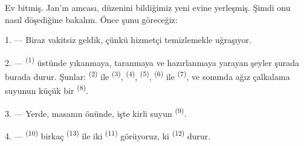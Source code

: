 %
%

\VUsaut{6.0mm}
\VUsaut{1.4mm}
\VUsaut{0.4mm}
\VUsaut{2.2mm}

Ev bitmiş. Jan'ın amcası, düzenini bildiğimiz yeni evine yerleşmiş.
Şimdi onu nasıl döşediğine bakalım. Önce şunu göreceğiz:

\VUsaut{3.0mm}

1. --- Biraz vakitsiz geldik, çünkü hizmetçi  temizlemekle
uğraşıyor.

2. ---  \textsuperscript{(1)} üstünde yıkanmaya,
taranmaya ve hazırlanmaya yarayan şeyler şurada burada durur. Şunlar:
 \textsuperscript{(2)} ile 
\textsuperscript{(3)},  \textsuperscript{(4)},
 \textsuperscript{(5)},  \textsuperscript{(6)} ile
 \textsuperscript{(7)}, ve sonunda ağız çalkalama suyunun küçük
bir  \textsuperscript{(8)}.

3. --- Yerde, masanın önünde, işte kirli suyun 
\textsuperscript{(9)}.

4. ---  \textsuperscript{(10)} birkaç 
\textsuperscript{(13)} ile iki  \textsuperscript{(11)}
görüyoruz, ki  \textsuperscript{(12)} durur.

